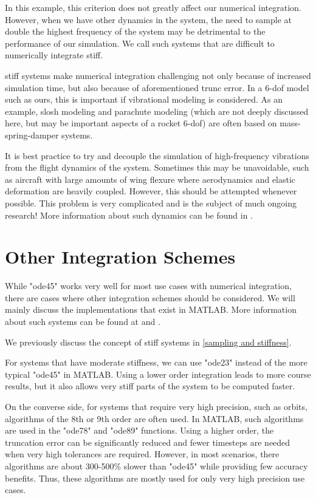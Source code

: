 \documentclass[12pt]{report}
\begin{document}
{In this example, this criterion does not greatly affect our numerical integration. However, when we have other dynamics in the system, the need to sample at double the highest frequency of the system may be detrimental to the performance of our simulation. We call such systems that are difficult to numerically integrate \gls{stiff}. 

\Gls{stiff} systems make numerical integration challenging not only because of increased simulation time, but also because of aforementioned \gls{trunc error}. In a 6-\gls{dof} model such as ours, this is important if vibrational modeling is considered. As an example, slosh modeling and parachute modeling (which are not deeply discussed here, but may be important aspects of a rocket 6-\gls{dof}) are often based on mass-spring-damper systems.

It is best practice to try and decouple the simulation of high-frequency vibrations from the flight dynamics of the system. Sometimes this may be unavoidable, such as aircraft with large amounts of wing flexure where aerodynamics and elastic deformation are heavily coupled. However, this should be attempted whenever possible. This problem is very complicated and is the subject of much ongoing research! More information about such dynamics can be found in \cite{shyy_recent_2010}.
\section{Other Integration Schemes}
While "ode45" works very well for most use cases with numerical integration, there are cases where other integration schemes should be considered. We will mainly discuss the implementations that exist in MATLAB. More information about such systems can be found at \cite{mathworks_choose_2024} and \cite{mathworks_summary_2024}.

We previously discuss the concept of \gls{stiff} systems in \ref{sampling and stiffness}. 

For systems that have moderate stiffness, we can use "ode23" instead of the more typical "ode45" in MATLAB. Using a lower order integration leads to more course results, but it also allows very stiff parts of the system to be computed faster.

On the converse side, for systems that require very high precision, such as orbits, algorithms of the 8th or 9th order are often used. In MATLAB, such algorithms are used in the "ode78" and "ode89" functions. Using a higher order, the truncation error can be significantly reduced and fewer timesteps are needed when very high tolerances are required. However, in most scenarios, there algorithms are about 300-500\% slower than "ode45" while providing few accuracy benefits. Thus, these algorithms are mostly used for only very high precision use cases.

}
\end{document}

